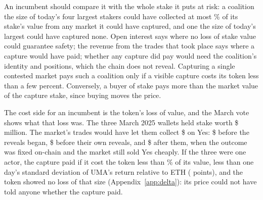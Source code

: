 \documentclass[conference,compsoc]{IEEEtran}
\begin{document}
 An incumbent should compare it with the whole stake it puts at risk: a coalition the size of today's four largest stakers could have collected at most \execTopFourMaxPct\% of its stake's value from any market it could have captured, and one the size of today's largest could have captured none. Open interest says where no loss of stake value could guarantee safety; the revenue from the trades that took place says where a capture would have paid; whether any capture did pay would need the coalition's identity and positions, which the chain does not reveal. Capturing a single contested market pays such a coalition only if a visible capture costs its token less than a few percent. Conversely, a buyer of stake pays more than the market value of the capture stake, since buying moves the price.

 The cost side for an incumbent is the token's loss of value, and the March vote shows what that loss was. The three March 2025 wallets held stake worth \$\marchWhaleUsdM{} million. The market's trades would have let them collect \$\execMarch{} on Yes: \$\execMarchDispute{} before the reveals began, \$\execMarchReveal{} before their own reveals, and \$\execMarchAfter{} after them, when the outcome was fixed on-chain and the market still sold Yes cheaply. If the three were one actor, the capture paid if it cost the token less than \execMarchWhalePct\% of its value, less than one day's standard deviation of UMA's return relative to ETH (\econSdEthOne{} points), and the token showed no loss of that size (Appendix~\ref{app:delta}): its price could not have told anyone whether the capture paid.
\end{document}
